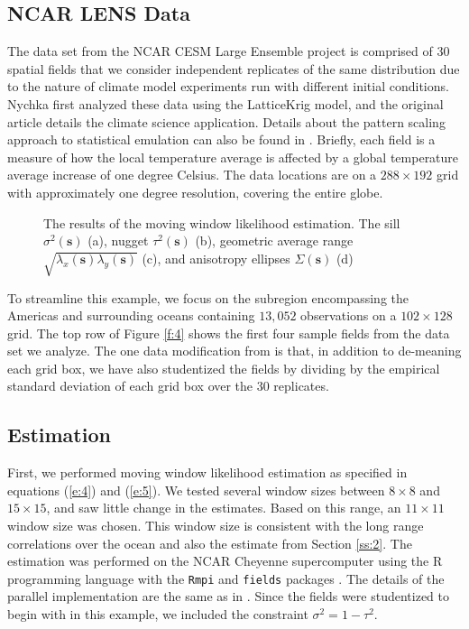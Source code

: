 \documentclass[review]{elsarticle}
\begin{document}
\subsection{NCAR LENS Data}

The data set from the NCAR CESM Large Ensemble project \cite{kay2015community} is comprised of 30 spatial fields that we consider independent replicates of the same distribution due to the nature of climate model experiments run with different initial conditions. Nychka \cite{nychka2018modeling} first analyzed these data using the LatticeKrig model, and the original article details the climate science application. Details about the pattern scaling approach to statistical emulation can also be found in \cite{alexeeff2018emulating}. Briefly, each field is a measure of how the local temperature average is affected by a global temperature average increase of one degree Celsius. The data locations are on a $288 \times 192$ grid with approximately one degree resolution, covering the entire globe. 

\begin{figure}
    \centering
    \caption{The results of the moving window likelihood estimation. The sill $\sigma^2( \mathbf s)$ (a), nugget $\tau^2( \mathbf s)$ (b), geometric average range $\sqrt{\lambda_x ( \mathbf s) \lambda_y ( \mathbf s)}$ (c), and anisotropy ellipses $\Sigma ( \mathbf s)$ (d)}
    \label{f:3}
\end{figure}

To streamline this example, we focus on the subregion encompassing the Americas and surrounding oceans containing $13,052$ observations on a $102 \times 128$ grid. The top row of Figure \ref{f:4} shows the first four sample fields from the data set we analyze. The one data modification from \cite{nychka2018modeling} is that, in addition to de-meaning each grid box, we have also studentized the fields by dividing by the empirical standard deviation of each grid box over the 30 replicates. 

\subsection{Estimation}


First, we performed moving window likelihood estimation as specified in equations (\ref{e:4}) and (\ref{e:5}). We tested several window sizes between $8 \times 8$ and $15 \times 15$, and saw little change in the estimates.  Based on this range, an $11 \times 11$ window size was chosen. This window size is consistent with the long range correlations over the ocean and also the estimate from Section \ref{ss:2}. The estimation was performed on the NCAR Cheyenne supercomputer \cite{cheyenne} using the R programming language \cite{Rcore} with the \texttt{Rmpi} \cite{yu2002rmpi} and \texttt{fields} packages \cite{fields}. The details of the parallel implementation are the same as in \cite{nychka2018modeling}. Since the fields were studentized to begin with in this example, we included the constraint $\sigma^2 = 1 - \tau^2$.
\end{document}
